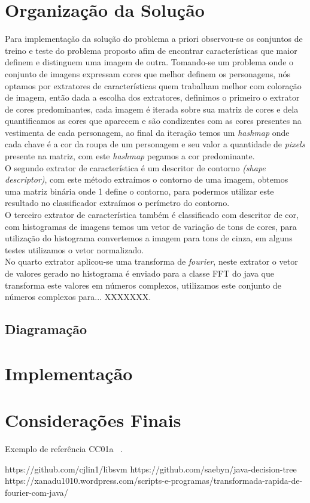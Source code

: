 \documentclass[12pt]{article}
\begin{document}
\section{Organização da Solução}\label{sec:solucao}

	Para implementação da solução do problema a priori observou-se os conjuntos de treino e teste do problema proposto afim de encontrar características que maior definem e distinguem uma imagem de outra. Tomando-se um problema onde o conjunto de imagens expressam cores que melhor definem os personagens, nós optamos por extratores de características quem trabalham melhor com coloração de imagem, então dada a escolha dos extratores, definimos o primeiro o extrator de cores predominantes, cada imagem é iterada sobre sua matriz de cores e dela quantificamos as cores que aparecem e são condizentes com as cores presentes na vestimenta de cada personagem, ao final da iteração temos um \textit{hashmap} onde cada chave é a cor da roupa de um personagem e seu valor a quantidade de \textit{pixels} presente na matriz, com este \textit{hashmap} pegamos a cor predominante.\\
	O segundo extrator de característica é um descritor de contorno \textit{(shape descriptor)}, com este método extraímos o contorno de uma imagem, obtemos uma matriz binária onde 1 define o contorno, para podermos utilizar este resultado no classificador extraímos o perímetro do contorno. \\
	O terceiro extrator de característica também é classificado com descritor de cor, com histogramas de imagens temos um vetor de variação de tons de cores, para utilização do histograma convertemos a imagem para tons de cinza, em alguns testes utilizamos o vetor normalizado.\\
	No quarto extrator aplicou-se uma transforma de \textit{fourier}, neste extrator o vetor de valores gerado no histograma é enviado para a classe FFT do java que transforma este valores em números complexos, utilizamos este conjunto de números complexos para... XXXXXXX.



\subsection{Diagramação}\label{sec:diagramacao}
	
	




\section{Implementação}



\section{Considerações Finais}


Exemplo de referência CC01a ~\cite{CC01}.

https://github.com/cjlin1/libsvm
https://github.com/saebyn/java-decision-tree
https://xanadu1010.wordpress.com/scripts-e-programas/transformada-rapida-de-fourier-com-java/

{}

\end{document}
